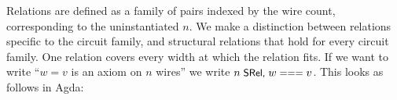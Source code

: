 Relations are defined as a family of pairs indexed by the wire count, corresponding to the
uninstantiated $n$. We make a distinction between relations specific to
the circuit family, and structural relations that hold for every circuit family.
One relation covers every
width at which the relation fits. 
If we want to write ``$w = v$ is an axiom on $n$ wires''
we write $n\;\aid{SRel,}\;w \aidrel{===} v$.
This looks as follows in Agda:

\begin{center}
\begin{minipage}[c]{0.58\linewidth}
\begingroup\setlength{\mathindent}{0pt}
\begin{code}%
\>[0]\AgdaSpace{}%
\AgdaSpace{}%
\AgdaSymbol{:}\AgdaSpace{}%
\AgdaSymbol{(}\AgdaSpace{}%
\AgdaSymbol{:}\AgdaSpace{}%
\AgdaSymbol{)}\AgdaSpace{}%
\AgdaSpace{}%
\AgdaSpace{}%
\AgdaSymbol{(}\AgdaSpace{}%
\AgdaSymbol{)}\AgdaSpace{}%
\<%
\\
\>[0][@{}l@{\AgdaIndent{0}}]%
\>[2]%
\>[14]\AgdaSymbol{:}\AgdaSpace{}%
\AgdaSymbol{(}\AgdaSpace{}%
\AgdaSymbol{)}\AgdaSpace{}%
\AgdaSpace{}%
\AgdaSpace{}%
\AgdaSpace{}%
\AgdaSpace{}%
\AgdaOperator{\AgdaDatatype{===}}\AgdaSpace{}%
\<%
\\
%
\>[2]\AgdaSpace{}%
\AgdaSymbol{:}\AgdaSpace{}%
\AgdaSymbol{(}\AgdaSpace{}%
\AgdaSymbol{)}\AgdaSpace{}%
\AgdaSpace{}%
\AgdaSpace{}%
\AgdaSpace{}%
\AgdaSpace{}%
\AgdaSpace{}%
\AgdaSpace{}%
\AgdaSpace{}%
\AgdaOperator{\AgdaDatatype{===}}\AgdaSpace{}%
\AgdaSpace{}%
\AgdaSpace{}%
\AgdaSpace{}%
\AgdaSpace{}%
\AgdaSpace{}%
\AgdaSpace{}%
\<%
\end{code}
\endgroup
\end{minipage}\hspace{2.5em}%
\begin{minipage}[c]{0.28\linewidth}\centering
  \\[4pt]
\end{minipage}
\end{center}


